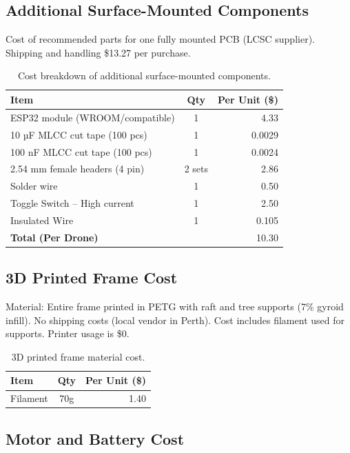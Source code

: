 \subsection{Additional Surface-Mounted Components}

Cost of recommended parts for one fully mounted PCB (LCSC supplier). Shipping and handling \$13.27 per purchase.

\begin{table}[H]
\centering
\begin{tabular}{l c r}
\toprule
\textbf{Item} & \textbf{Qty} & \textbf{Per Unit (\$)} \\
\midrule
ESP32 module (WROOM/compatible) & 1 & 4.33 \\
10 µF MLCC cut tape (100 pcs) & 1 & 0.0029 \\
100 nF MLCC cut tape (100 pcs) & 1 & 0.0024 \\
2.54 mm female headers (4 pin) & 2 sets & 2.86 \\
Solder wire & 1 & 0.50 \\
Toggle Switch – High current & 1 & 2.50 \\
Insulated Wire & 1 & 0.105 \\
\midrule
\textbf{Total (Per Drone)} & & 10.30 \\
\bottomrule
\end{tabular}
\caption{Cost breakdown of additional surface-mounted components.}
\end{table}

\subsection{3D Printed Frame Cost}

Material: Entire frame printed in PETG with raft and tree supports (7\% gyroid infill). No shipping costs (local vendor in Perth). Cost includes filament used for supports. Printer usage is \$0.

\begin{table}[H]
\centering
\begin{tabular}{l c r}
\toprule
\textbf{Item} & \textbf{Qty} & \textbf{Per Unit (\$)} \\
\midrule
Filament & 70g & 1.40 \\
\bottomrule
\end{tabular}
\caption{3D printed frame material cost.}
\end{table}

\subsection{Motor and Battery Cost}

